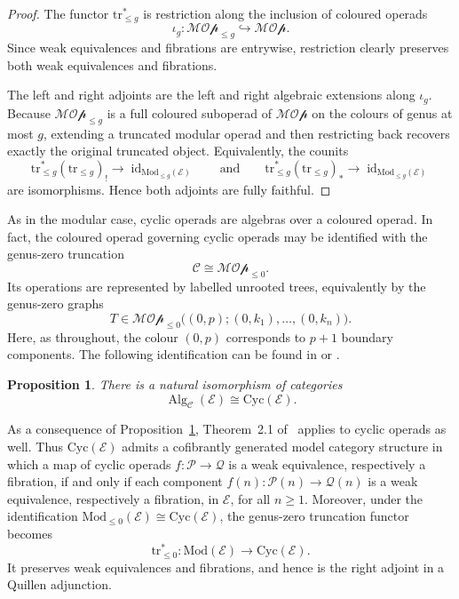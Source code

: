 \documentclass{amsart}
\newcommand{\bE}{\mathscr{E}}
\newcommand{\Mod}{\mathrm{Mod}}
\newcommand{\Cyc}{\mathrm{Cyc}}
\newcommand{\id}{\operatorname{id}}
\newcommand{\Alg}{\operatorname{Alg}}
\newcommand{\trun}[1]{\mathrm{tr}_{\leq{#1}}}
\newtheorem{prop}[theorem]{Proposition}%
\theoremstyle{definition}
\numberwithin{equation}{section}
\begin{document}
\begin{proof}
The functor $\trun{g}^*$ is restriction along the inclusion of coloured operads
\[
\iota_g:\mathcal{MOp}_{\leq g}\hookrightarrow \mathcal{MOp}.
\]
Since weak equivalences and fibrations are entrywise, restriction clearly preserves both weak equivalences and fibrations.

The left and right adjoints are the left and right algebraic extensions along $\iota_g$. Because $\mathcal{MOp}_{\leq g}$ is a full coloured suboperad of $\mathcal{MOp}$ on the colours of genus at most $g$, extending a truncated modular operad and then restricting back recovers exactly the original truncated
object. Equivalently, the counits
\[
\trun{g}^*(\trun{g})_! \longrightarrow \id_{\Mod_{\leq g}(\bE)}
\qquad\text{and}\qquad
\trun{g}^*(\trun{g})_* \longrightarrow \id_{\Mod_{\leq g}(\bE)}
\]
are isomorphisms. Hence both adjoints are fully faithful.
\end{proof}

As in the modular case, cyclic operads are algebras over a coloured operad. In fact, the coloured operad governing cyclic operads may be identified with the
genus-zero truncation
\[
\mathcal C \cong \mathcal{MOp}_{\leq 0}.
\]
Its operations are represented by labelled unrooted trees, equivalently by the genus-zero graphs
\[
T\in
\mathcal{MOp}_{\leq 0}\bigl((0,p);(0,k_1),\ldots,(0,k_n)\bigr).
\]
Here, as throughout, the colour $(0,p)$ corresponds to $p+1$ boundary components. The following identification can be found in \cite[Example~A3]{dch_coextension} or \cite[Section~1.6.4]{lukacs2010cyclic}.

\begin{prop}\label{prop: cyc are genus 0 modular operads}
There is a natural isomorphism of categories
\[
\Alg_{\mathcal C}(\bE)\cong \Cyc(\bE).
\]
\end{prop}

As a consequence of Proposition~\ref{prop: cyc are genus 0 modular operads}, Theorem~2.1 of~\cite{bm_resolutions} applies to cyclic operads as well. Thus $\Cyc(\bE)$ admits a cofibrantly generated model category structure in which a map of cyclic operads $f:\mathcal P\to\mathcal Q$ is a weak equivalence,
respectively a fibration, if and only if each component $f(n):\mathcal P(n)\longrightarrow\mathcal Q(n)$ is a weak equivalence, respectively a fibration, in $\bE$, for all $n\geq 1$. Moreover, under the identification $\Mod_{\leq 0}(\bE)\cong\Cyc(\bE)$, the genus-zero truncation functor becomes
\[
\trun{0}^*:\Mod(\bE)\longrightarrow \Cyc(\bE).
\]
It preserves weak equivalences and fibrations, and hence is the right adjoint in a Quillen adjunction.
\end{document}
